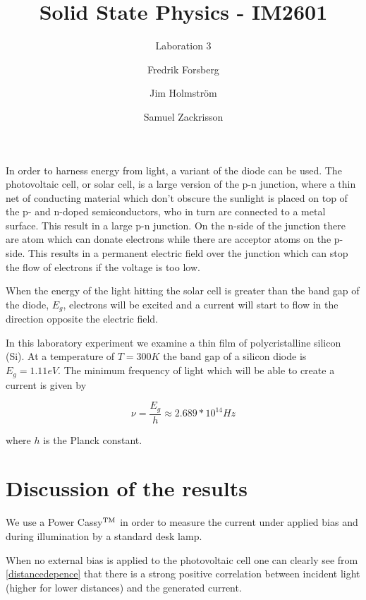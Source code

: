 \documentclass[a4paper,twoside=false,abstract=false,numbers=noenddot,
titlepage=false,headings=small,parskip=half,version=last]{scrartcl}
\title{Solid State Physics - IM2601}
\subtitle{Laboration 3}
\author[1]{Fredrik Forsberg}
\author[1]{Jim Holmström}
\author[1]{Samuel Zackrisson}
\affil[1]{Engineering Physics, Royal Institute of Technology}
\affil[1]{\{fforsber, jimho, samuelz\}@kth.se}
\begin{document}
\maketitle
\thispagestyle{empty}


In order to harness energy from light, a variant of the diode can be used. The
photovoltaic cell, or solar cell, is a large version of the p-n junction, where a thin net of conducting material
which don't obscure the sunlight is placed on top of the p- and n-doped semiconductors,
who in turn are connected to a metal surface. This result in a large p-n junction.
On the n-side of the junction there are atom which can donate electrons while there are acceptor
atoms on the p-side.
This results in a permanent electric field over the junction which can stop the flow of electrons if the voltage is too low.

When the energy of the light hitting the solar cell is greater than the band gap of the diode, $E_g$, electrons will be excited and a current will start to flow in the direction opposite the electric field.

In this laboratory experiment we examine a thin film of polycristalline silicon (Si). At a temperature of $T = 300 K$ the band gap of a silicon diode is $E_g=1.11 eV$. The minimum frequency of light which will be able to create a current is given by

\begin{equation}
    \nu = \frac{E_g}{h} \approx 2.689*10^{14} Hz
\end{equation}

where $h$ is the Planck constant.

\section{Discussion of the results}

We use a Power Cassy$\textsuperscript{TM}$ in order to measure the current under applied bias and during illumination by a standard desk lamp.

When no external bias is applied to the photovoltaic cell one can clearly see
from \ref{distancedepence} that there is a strong positive correlation between
incident light (higher for lower distances) and the generated current.

\end{document}
